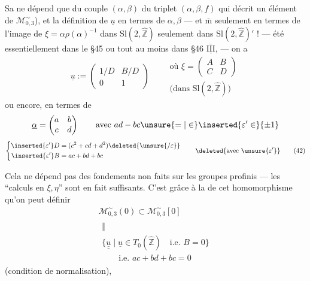 Sa   ne dépend que du couple
$(\alpha,\beta)$  du triplet $(\alpha,\beta,f)$
qui décrit un élément de $\mathcal M_{0,3}^{\sim}$), et
la  définition de $\underline u$ en termes de
$\alpha,\beta$ --- et $\overline{\mathrm m}$ seulement en termes
de l'image de $\xi=\alpha\rho(\alpha)^{-1}$ dans
$\mathrm{Sl}(2,\widehat{\mathbb Z})$
 seulement dans
$\mathrm{Sl}(2,\widehat{\mathbb Z})'$ ! ---
 été  essentiellement dans le \S45
ou tout au moins dans \S46 $\overline{\underline{\mathrm{III}}}$, --- on a
\[
\underline u:=\begin{pmatrix}1/D&B/D\\0&1\end{pmatrix}
\qquad\begin{gathered}
\text{où }\xi=\begin{pmatrix}A&B\\C&D\end{pmatrix}\\
\text{(dans }\mathrm{Sl}(2,\widehat{\mathbb Z})\text{)}
\end{gathered}
\tag{41}
\]
ou encore, en termes de
\[
\underline\alpha=\begin{pmatrix}a&b\\c&d\end{pmatrix}
\qquad\text{avec }ad-bc\unsure{=|\in}\inserted{\varepsilon'\in}\{\pm1\}
\]
\[
\left\{\begin{aligned}
\inserted{\varepsilon'}D&=(c^2+cd+d^2)\deleted{\unsure{/\varepsilon}}\\
\inserted{\varepsilon'}B&=ac+bd+bc
\end{aligned}\right.
\qquad\deleted{\text{avec }\unsure{\varepsilon'}}
\tag{42}
\]

Cela ne dépend pas des fondements non faits sur les groupes profinis ---
les ``calculs en $\xi,\eta$'' sont en fait suffisants.
C'est grâce à la  de cet homomorphisme
qu'on peut définir
\[
\begin{gathered}
\mathcal M_{0,3}^{\sim}(0)\subset\mathcal M_{0,3}^{\sim}[0]\\
\begin{array}{c}
\Vert\\
\{\underline{\underline u}\mid\underline u\in T_0(\widehat{\mathbb Z})
\quad\text{i.e. }B=0\}\\
\qquad\text{i.e. }ac+bd+bc=0
\end{array}
\end{gathered}
\tag{43}
\]
(condition de normalisation),

